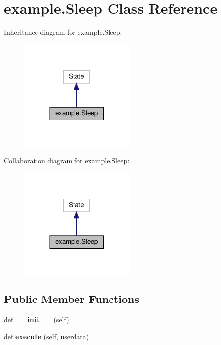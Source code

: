 \hypertarget{classexample_1_1Sleep}{}\section{example.\+Sleep Class Reference}
\label{classexample_1_1Sleep}


Inheritance diagram for example.\+Sleep\+:
\nopagebreak
\begin{figure}[H]
\begin{center}
\leavevmode
\includegraphics[width=161pt]{classexample_1_1Sleep__inherit__graph}
\end{center}
\end{figure}


Collaboration diagram for example.\+Sleep\+:
\nopagebreak
\begin{figure}[H]
\begin{center}
\leavevmode
\includegraphics[width=161pt]{classexample_1_1Sleep__coll__graph}
\end{center}
\end{figure}
\subsection*{Public Member Functions}
\begin{DoxyCompactItemize}
\item 
\mbox{\label{classexample_1_1Sleep_a5898c88273d5801d9f92d9f3424cf35f}} 
def {\bfseries \+\_\+\+\_\+init\+\_\+\+\_\+} (self)
\item 
\mbox{\label{classexample_1_1Sleep_a1afe180c40fa9caea20abc8944849af8}} 
def {\bfseries execute} (self, userdata)
\end{DoxyCompactItemize}


